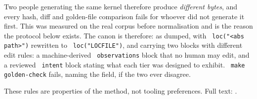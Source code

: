 \documentclass[11pt,a4paper]{article}
\newcommand{\code}[1]{\texttt{\small\hyphenchar\font=45 #1}}
\begin{document}
\begin{center}
\end{center}

\noindent Two people generating the same kernel therefore produce \emph{different bytes}, and every hash,
diff and golden-file comparison fails for whoever did not generate it first. This was measured on the real
corpus before normalisation and is the reason the protocol below exists. The canon is therefore:
 as dumped,  with \code{loc("<abs path>")} rewritten to
\code{loc("LOCFILE")}, and  carrying two blocks with different edit rules: a
machine-derived \code{observations} block that no human may edit, and a reviewed \code{intent} block stating
what each tier was designed to exhibit. \code{make golden-check} fails, naming the field, if the two ever
disagree.

\noindent These rules are properties of the method, not tooling preferences. Full text:
.
\end{document}
